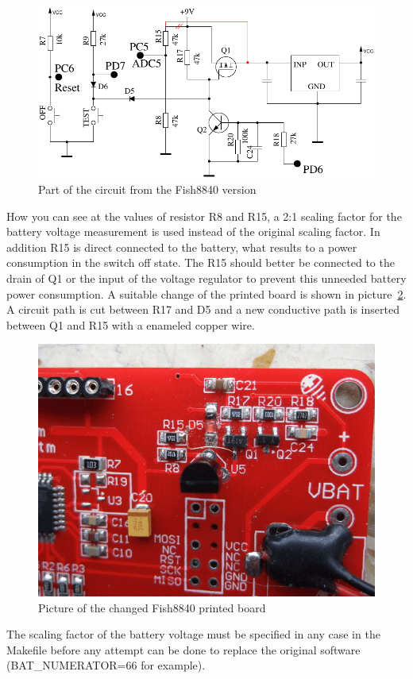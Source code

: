 \begin{figure}[H]
\centering
\includegraphics[width=.698\textwidth]{../FIG/Fish8840.pdf}
\caption{Part of the circuit from the Fish8840 version}
\label{fig:Fish8840}
\end{figure}

How you can see at the values of resistor R8 and R15,
a 2:1 scaling factor for the battery voltage measurement is used instead of the original scaling factor.
In addition R15 is direct connected to the battery, what results to a power consumption in the switch off state.
The R15 should better be connected to the drain of Q1 or the input of the voltage regulator to prevent this
unneeded battery power consumption.
A suitable change of the printed board is shown in picture~\ref{fig:Fish8840patch}.
A circuit path is cut between R17 and D5 and a new conductive path is inserted between Q1 and
R15 with a enameled copper wire.

\begin{figure}[H]
\centering
\includegraphics[width=.698\textwidth]{../PNG/Fish8840patch.jpg}
\caption{Picture of the changed Fish8840 printed board}
\label{fig:Fish8840patch}
\end{figure}

The scaling factor of the battery voltage must be specified in any case in the Makefile before any
attempt can be done to replace the original software (BAT\_NUMERATOR=66 for example).

